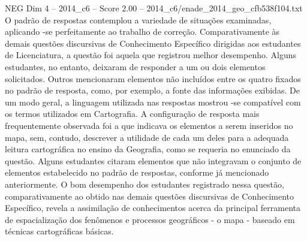 \begin{textsample}{NEG Dim 4 – 2014\_c6 – Score 2.00 – 2014\_c6/enade\_2014\_geo\_cfb538f104.txt}
O padrão de respostas contemplou a variedade de situações examinadas, aplicando -se perfeitamente ao trabalho de correção.
Comparativamente às demais questões discursivas de Conhecimento Específico dirigidas aos estudantes de Licenciatura, a questão foi aquela que registrou melhor desempenho.
Alguns estudantes, no entanto, deixaram de responder a um ou dois elementos solicitados.
Outros mencionaram elementos não incluídos entre os quatro fixados no padrão de resposta, como, por exemplo, a fonte das informações exibidas.
De um modo geral, a linguagem utilizada nas respostas mostrou -se compatível com os termos utilizados em Cartografia.
A configuração de resposta mais frequentemente observada foi a que indicava os elementos a serem inseridos no mapa, sem, contudo, descrever a utilidade de cada um deles para a adequada leitura cartográfica no ensino da Geografia, como se requeria no enunciado da questão.
Alguns estudantes citaram elementos que não integravam o conjunto de elementos estabelecido no padrão de respostas, conforme já mencionado anteriormente.
O bom desempenho dos estudantes registrado nessa questão, comparativamente ao obtido nas demais questões discursivas de Conhecimento Específico, revela a assimilação de conhecimentos acerca da principal ferramenta de espacialização dos fenômenos e processos geográficos - o mapa - baseado em técnicas cartográficas básicas.

\end{textsample}
